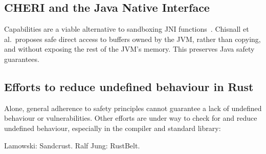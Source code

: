 \documentclass[dissertation.tex]{subfiles}
\begin{document}

\subsection{CHERI and the Java Native Interface}
\label{sec:bg-cheri-jni}

Capabilities are a viable alternative to sandboxing JNI
functions~\cite{cheri-jni}.
Chisnall et al.~proposes safe direct access to buffers owned by the JVM,
rather than copying, and without exposing the rest of the JVM's memory.
This preserves Java safety guarantees.


\subsection{Efforts to reduce undefined behaviour in Rust}
Alone, general adherence to safety principles cannot guarantee a lack of
undefined behaviour or vulnerabilities.
Other efforts are under way to check for and reduce undefined behaviour,
especially in the compiler and standard library:

Lamowski: Sandcrust.
Ralf Jung: RustBelt.
\end{document}

